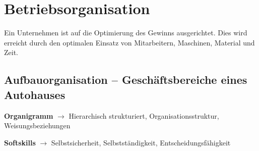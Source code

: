 \section{Betriebsorganisation}\label{betriebsorganisation}

Ein Unternehmen ist auf die Optimierung des Gewinns ausgerichtet. Dies
wird erreicht durch den optimalen Einsatz von Mitarbeitern, Maschinen,
Material und Zeit.

\newpage

\subsection{Aufbauorganisation -- Geschäftsbereiche eines
Autohauses}\label{aufbauorganisation-geschaeftsbereiche-eines-autohauses}

\textbf{Organigramm} $\to$ Hierarchisch strukturiert,
Organisationsstruktur, Weisungsbeziehungen

\textbf{Softskills} $\to$ Selbstsicherheit, Selbstständigkeit,
Entscheidungsfähigkeit

